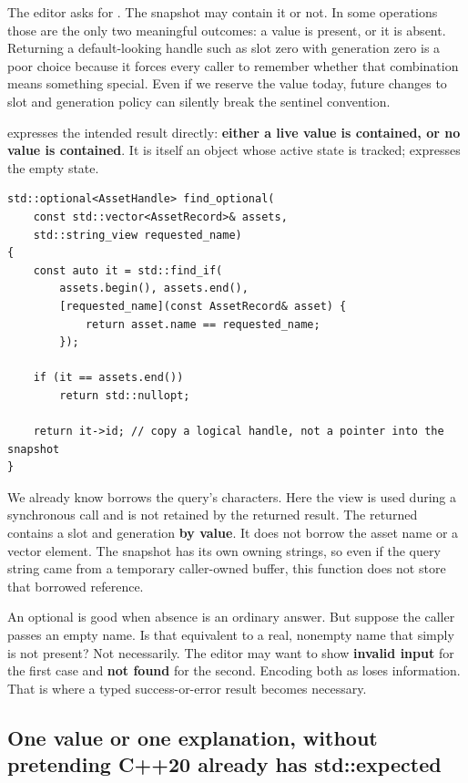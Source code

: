 The editor asks for . The snapshot may contain it or not. In some operations those are the only two meaningful outcomes: a value is present, or it is absent. Returning a default-looking handle such as slot zero with generation zero is a poor choice because it forces every caller to remember whether that combination means something special. Even if we reserve the value today, future changes to slot and generation policy can silently break the sentinel convention.

 expresses the intended result directly: \textbf{either a live  value is contained, or no  value is contained}. It is itself an object whose active state is tracked;  expresses the empty state.

\begin{verbatim}
std::optional<AssetHandle> find_optional(
    const std::vector<AssetRecord>& assets,
    std::string_view requested_name)
{
    const auto it = std::find_if(
        assets.begin(), assets.end(),
        [requested_name](const AssetRecord& asset) {
            return asset.name == requested_name;
        });

    if (it == assets.end())
        return std::nullopt;

    return it->id; // copy a logical handle, not a pointer into the snapshot
}
\end{verbatim}

We already know  borrows the query's characters. Here the view is used during a synchronous call and is not retained by the returned result. The returned  contains a slot and generation \textbf{by value}. It does not borrow the asset name or a vector element. The snapshot has its own owning strings, so even if the query string came from a temporary caller-owned buffer, this function does not store that borrowed reference.

An optional is good when absence is an ordinary answer. But suppose the caller passes an empty name. Is that equivalent to a real, nonempty name that simply is not present? Not necessarily. The editor may want to show \textbf{invalid input} for the first case and \textbf{not found} for the second. Encoding both as  loses information. That is where a typed success-or-error result becomes necessary.

\subsection{One value or one explanation, without pretending C++20 already has std::expected}\label{05-engine-i-ch006-one-value-or-one-explanation-without-pretending-c20-already-has-stdexpected}

